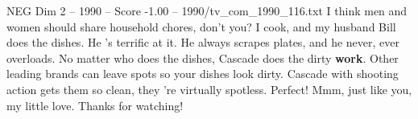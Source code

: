 \begin{textsample}{NEG Dim 2 – 1990 – Score -1.00 – 1990/tv\_com\_1990\_116.txt}  \label{ex:f2_neg_064}
I think men and women should share household chores, don't you?
I cook, and my husband Bill does the dishes.
He 's terrific at it.
He always scrapes plates, and he never, ever overloads.
No matter who does the dishes, Cascade does the dirty \textbf{work}.
Other leading brands can leave spots so your dishes look dirty.
Cascade with shooting action gets them so clean, they 're virtually spotless.
Perfect!
Mmm, just like you, my little love.
Thanks for watching!

\end{textsample}
